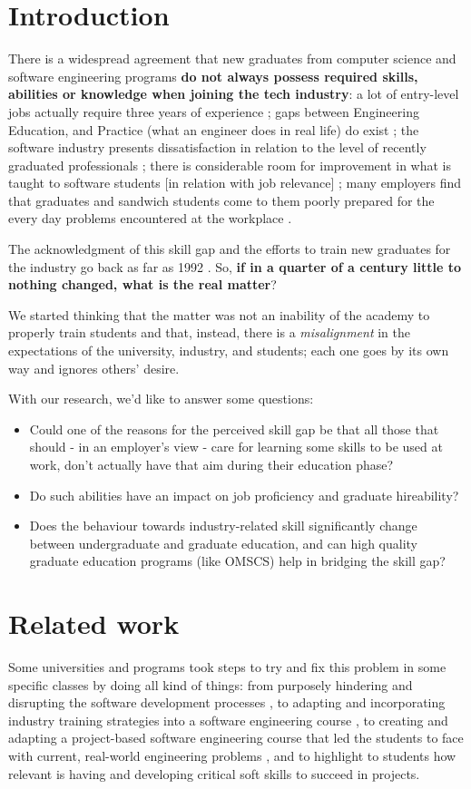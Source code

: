 \documentclass{sigchi}
\begin{document}
\section{Introduction}
There is a widespread agreement that new graduates from computer science and software engineering programs \textbf{do not always possess required skills, abilities or knowledge when joining the tech industry}: a lot of entry-level jobs actually require three years of experience \cite{Chakrabarti2018}; gaps between Engineering Education, and Practice (what an engineer does in real life) do exist \cite{Sivanesan2017}; the software industry presents dissatisfaction in relation to the level of recently graduated professionals \cite{Portela2017}; there is considerable room for improvement in what is taught to software students [in relation with job relevance] \cite{Lethbridgea}; many employers find that graduates and sandwich students come to them poorly prepared for the every day problems encountered at the workplace \cite{Dawson2000}.

The acknowledgment of this skill gap and the efforts to train new graduates for the industry go back as far as 1992 \cite{Dawson1992}. So, \textbf{if in a quarter of a century little to nothing changed, what is the real matter}?

We started thinking that the matter was not an inability of the academy to properly train students and that, instead, there is a \textit{misalignment} in the expectations of the university, industry, and students; each one goes by its own way and ignores others' desire.

With our research, we'd like to answer some	questions:
\begin{itemize}
\item Could one of the reasons for the perceived skill gap be that all those that should - in an employer's view - care for learning some skills to be used at work, don't actually have that aim during their education phase? 
\item Do such abilities have an impact on job proficiency and graduate hireability?
\item Does the behaviour towards industry-related skill significantly change between undergraduate and graduate education, and can high quality graduate education programs (like OMSCS) help in bridging the skill gap?
\end{itemize}

\section{Related work}
Some universities and programs took steps to try and fix this problem in some specific classes by doing all kind of things: from purposely hindering and disrupting the software development processes \cite{Dawson2000}, to adapting and incorporating industry training strategies into a software engineering course \cite{Portela2017}, to creating and adapting a project-based software engineering course that led the students to face with current, real-world engineering problems \cite{Delgado2017}, and to highlight to students how relevant is having and developing critical soft skills to succeed in projects\cite{Bastarrica2017}.
\end{document}
